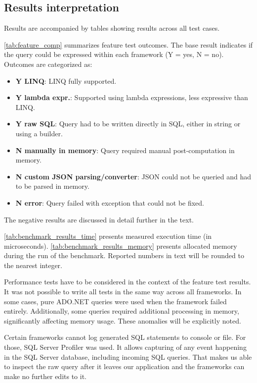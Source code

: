 \subsection{Results interpretation}
Results are accompanied by tables showing results across all test cases. 

\autoref{tab:feature_comp} summarizes feature test outcomes. The base result indicates if the query could be expressed within each framework (Y = yes, N = no). Outcomes are categorized as:
\begin{itemize}
    \item \textbf{Y LINQ}: LINQ fully supported.
    \item \textbf{Y lambda expr.}: Supported using lambda expressions, less expressive than LINQ.
    \item \textbf{Y raw SQL}: Query had to be written directly in SQL, either in string or using a builder.
    \item \textbf{N manually in memory}: Query required manual post-computation in memory.
    \item \textbf{N custom JSON parsing/converter}: JSON could not be queried and had to be parsed in memory.
    \item \textbf{N error}: Query failed with exception that could not be fixed. 
\end{itemize}
The negative results are discussed in detail further in the text.

\autoref{tab:benchmark_results_time} presents measured execution time (in microseconds). \autoref{tab:benchmark_results_memory} presents allocated memory during the run of the benchmark. Reported numbers in text will be rounded to the nearest integer.

Performance tests have to be considered in the context of the feature test results. It was not possible to write all tests in the same way across all frameworks. In some cases, pure ADO.NET queries were used when the framework failed entirely. Additionally, some queries required additional processing in memory, significantly affecting memory usage. These anomalies will be explicitly noted.

Certain frameworks cannot log generated SQL statements to console or file. For those, SQL Server Profiler\cite{sqlProfiler} was used. It allows capturing of any event happening in the SQL Server database, including incoming SQL queries. That makes us able to inspect the raw query after it leaves our application and the frameworks can make no further edits to it.

